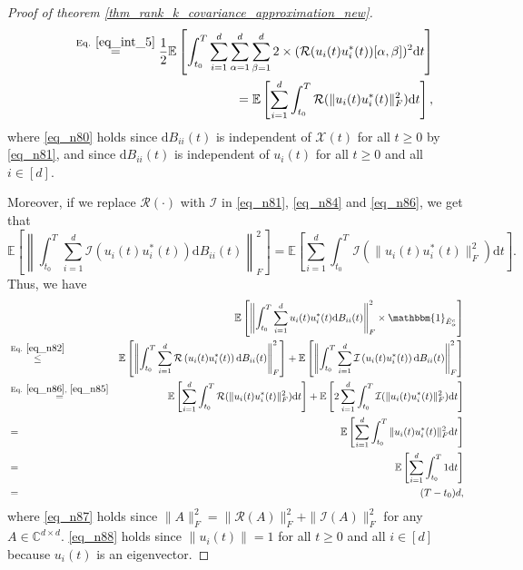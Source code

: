 \documentclass[11pt,letterpaper]{article}
\begin{document}
\begin{proof}[Proof of theorem \ref{thm_rank_k_covariance_approximation_new}]
\begin{eqnarray}
         & & \qquad \stackrel{\textrm{Eq. } \eqref{eq_int_5}}{=}   \frac{1}{2} \mathbb{E}\left[\int_{t_0}^T \sum_{i=1}^d  \sum_{\alpha = 1}^d \sum_{\beta = 1}^d 2 \times (\mathcal{R}(u_i(t) u_i^\ast(t))[\alpha, \beta])^2  \mathrm{d}t \right ] \nonumber\\
         & & \qquad = \mathbb{E}\left[\sum_{i=1}^d \int_{t_0}^T \mathcal{R}(\|u_i(t) u_i^\ast(t) \|_F^2) \mathrm{d}t \right],  \label{eq_n86} 
    \end{eqnarray}
    where \eqref{eq_n80} holds since $\mathrm{d}B_{i i}(t)$ is independent of $\mathcal{X}(t)$ for all $t\geq 0$ by \eqref{eq_n81}, and since $\mathrm{d}B_{i i}(t)$ is independent of $u_i(t)$ for all $t \geq 0$ and all $i \in [d]$.
   
   Moreover, if we replace $\mathcal{R}(\cdot)$ with $\mathcal{I}$ in \eqref{eq_n81}, \eqref{eq_n84} and \eqref{eq_n86}, we get that
   \begin{equation}\label{eq_n85}
 \mathbb{E}\left[\left\| \int_{t_0}^T \sum_{i=1}^d  \mathcal{I}\left(u_i(t) u_i^\ast(t)\right) \mathrm{d}B_{i i}(t)  \right\|_F^2 \right]  = \mathbb{E}\left[ \sum_{i=1}^d \int_{t_0}^T \mathcal{I}(\|u_i(t) u_i^\ast(t) \|_F^2) \mathrm{d}t \right ].
   \end{equation}   
  Thus, we have
   \begin{eqnarray}
& & \mathbb{E}\left[\left\|\int_{t_0}^T \sum_{i=1}^d  u_i(t) u_i^\ast(t) \mathrm{d}B_{i i}(t) \right\|_F^2 \times \mathbbm{1}_{\hat{E}_\alpha^c} \right] \nonumber\\
%
                & \stackrel{\textrm{Eq. } \eqref{eq_n82}}{\leq}&    \mathbb{E}\left[\left\| \int_{t_0}^T \sum_{i=1}^d  \mathcal{R}\left(u_i(t) u_i^\ast(t)\right) \mathrm{d}B_{i i}(t)  \right\|_F^2 \right] + \mathbb{E}\left[\left\| \int_{t_0}^T \sum_{i=1}^d  \mathcal{I}\left(u_i(t) u_i^\ast(t)\right) \mathrm{d}B_{i i}(t)  \right\|_F^2 \right] \nonumber \\
%
&\stackrel{\textrm{Eq. } \eqref{eq_n86}, \, \, \eqref{eq_n85}}{=}&  \mathbb{E}\left[ \sum_{i=1}^d \int_{t_0}^T \mathcal{R}(\|u_i(t) u_i^\ast(t) \|_F^2) \mathrm{d}t \right ]  + \mathbb{E}\left[2\sum_{i=1}^d \int_{t_0}^T \mathcal{I}(\|u_i(t) u_i^\ast(t) \|_F^2) \mathrm{d}t \right ] \nonumber\\
%
 &=& \mathbb{E}\left[ \sum_{i=1}^d \int_{t_0}^T \|u_i(t) u_i^\ast(t) \|_F^2 \mathrm{d}t \right ]  \label{eq_n87}\\
  &=& \mathbb{E}\left[ \sum_{i=1}^d \int_{t_0}^T 1 \mathrm{d}t \right ]  \label{eq_n88}\\
 &=&  (T-t_0) d,  \label{eq_a2}
%
   \end{eqnarray}
    where \eqref{eq_n87} holds since $\|A\|_F^2 = \|\mathcal{R}(A)\|_F^2 + \|\mathcal{I}(A)\|_F^2$ for any $A \in \mathbb{C}^{d \times d}$. 
    \eqref{eq_n88} holds since $\|u_i(t)\| = 1$ for all $t \geq 0$ and all $i \in [d]$ because $u_i(t)$ is an eigenvector.



\end{proof}
\end{document}
